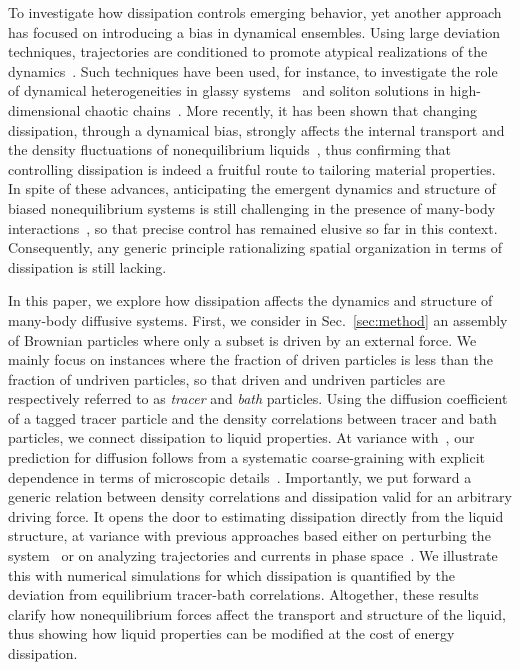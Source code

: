 \documentclass[superscriptaddress, twocolumn, prx, longbibliography, nofootinbib]{revtex4-1}
\begin{document}
To investigate how dissipation controls emerging behavior, yet another approach has focused on introducing a bias in dynamical ensembles. Using large deviation techniques, trajectories are conditioned to promote atypical realizations of the dynamics~\cite{Touchette2009, Jack2010}. Such techniques have been used, for instance, to investigate the role of dynamical heterogeneities in glassy systems~\cite{garrahan2007, Hedges2009, Pitard2011, Speck2012, Bodineau2012a, Limmer2014, Nemoto2017} and soliton solutions in high-dimensional chaotic chains~\cite{tailleur2007probing, laffargue2013}. More recently, it has been shown that changing dissipation, through a dynamical bias, strongly affects the internal transport and the density fluctuations of nonequilibrium liquids~\cite{Cagnetta2017, nemoto2018optimizing}, thus confirming that controlling dissipation is indeed a fruitful route to tailoring material properties. In spite of these advances, anticipating the emergent dynamics and structure of biased nonequilibrium systems is still challenging in the presence of many-body interactions~\cite{Chetrite2013, Jack2010}, so that precise control has remained elusive so far in this context. Consequently, any generic principle rationalizing spatial organization in terms of dissipation is still lacking.


In this paper, we explore how dissipation affects the dynamics and structure of many-body diffusive systems. First, we consider in Sec.~\ref{sec:method} an assembly of Brownian particles where only a subset is driven by an external force. We mainly focus on instances where the fraction of driven particles is less than the fraction of undriven particles, so that driven and undriven particles are respectively referred to as {\it tracer} and {\it bath} particles. Using the diffusion coefficient of a tagged tracer particle and the density correlations between tracer and bath particles, we connect dissipation to liquid properties. At variance with~\cite{delJunco2018}, our prediction for diffusion follows from a systematic coarse-graining with explicit dependence in terms of microscopic details~\cite{Dean1996, Demery2011, Demery2014}. Importantly, we put forward a generic relation between density correlations and dissipation valid for an arbitrary driving force. It opens the door to estimating dissipation directly from the liquid structure, at variance with previous approaches based either on perturbing the system~\cite{Harada2005, Mizuno2007, Visco2015, Turlier2016, Ahmed2018} or on analyzing trajectories and currents in phase space~\cite{Battle604, Gingrich2017, Roldan2018, Parrondo2018, Li2018}. We illustrate this with numerical simulations for which dissipation is quantified by the deviation from equilibrium tracer-bath correlations. Altogether, these results clarify how nonequilibrium forces affect the transport and structure of the liquid, thus showing how liquid properties can be modified at the cost of energy dissipation.
\end{document}
